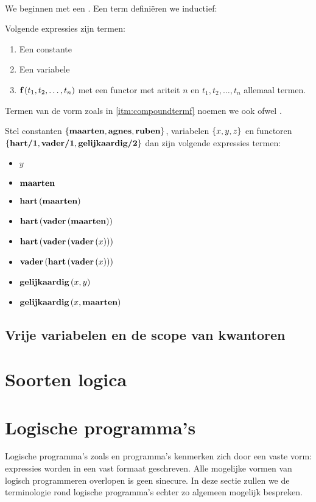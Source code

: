 \paragraph{}
We beginnen met een . Een term defini\"eren we inductief:
\begin{definition}[Term]
Volgende expressies zijn termen:
\begin{enumerate}
 \item Een constante
 \item Een variabele
 \item \label{itm:compoundtermf} $\textbf{\ensuremath{\mbox{f}}}\left( t_1,t_2,\ldots,t_n \right)$ met  een functor met ariteit $n$ en $t_1,t_2,\ldots,t_n$ allemaal termen.
\end{enumerate}
Termen van de vorm zoals in \ref{itm:compoundtermf} noemen we ook  ofwel .
\end{definition}
\begin{example}
Stel constanten $\left\{ \textbf{\ensuremath{\mbox{maarten}}},\textbf{\ensuremath{\mbox{agnes}}},\textbf{\ensuremath{\mbox{ruben}}} \right\}$, variabelen $\left\{ x,y,z \right\}$ en functoren $\left\{ \textbf{\ensuremath{\mbox{hart/1}}}, \textbf{\ensuremath{\mbox{vader/1}}}, \textbf{\ensuremath{\mbox{gelijkaardig/2}}} \right\}$ dan zijn volgende expressies termen:
\begin{multicols}{2}
\begin{itemize}
 \item $y$
 \item $\textbf{\ensuremath{\mbox{maarten}}}$
 \item $\textbf{\ensuremath{\mbox{hart}}}\left( \textbf{\ensuremath{\mbox{maarten}}} \right)$
 \item $\textbf{\ensuremath{\mbox{hart}}}\left( \textbf{\ensuremath{\mbox{vader}}}\left( \textbf{\ensuremath{\mbox{maarten}}} \right) \right)$
 \item $\textbf{\ensuremath{\mbox{hart}}}\left( \textbf{\ensuremath{\mbox{vader}}}\left( \textbf{\ensuremath{\mbox{vader}}}\left( x \right) \right) \right)$
 \item $\textbf{\ensuremath{\mbox{vader}}}\left( \textbf{\ensuremath{\mbox{hart}}}\left( \textbf{\ensuremath{\mbox{vader}}}\left( x \right) \right) \right)$
 \item $\textbf{\ensuremath{\mbox{gelijkaardig}}}\left( x,y \right)$
 \item $\textbf{\ensuremath{\mbox{gelijkaardig}}}\left( x,\textbf{\ensuremath{\mbox{maarten}}} \right)$
\end{itemize}
\end{multicols}
\end{example}
\subsection{Vrije variabelen en de scope van kwantoren}
\section{Soorten logica}
\section{Logische programma's}
Logische programma's zoals \prolog{} en \problog{} programma's kenmerken zich door een vaste vorm: expressies worden in een vast formaat geschreven. Alle mogelijke vormen van logisch programmeren overlopen is geen sinecure. In deze sectie zullen we de terminologie rond logische programma's echter zo algemeen mogelijk bespreken.